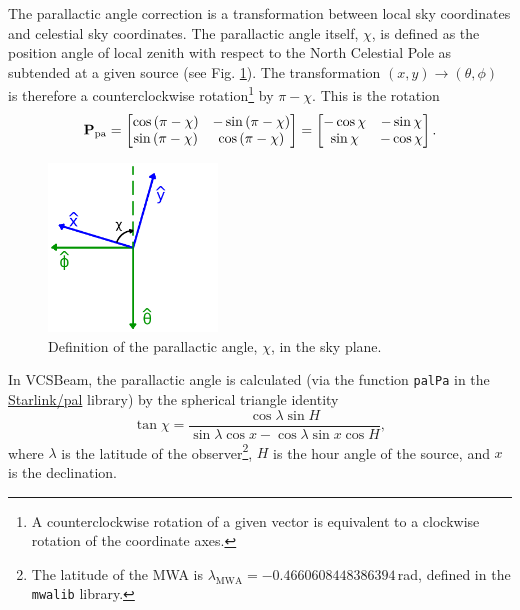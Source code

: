 \documentclass{book}
\newcommand{\vcsbeam}{{\sc VCSBeam}}
\newcommand{\pamat}{\ensuremath{{\bf P}_\text{pa}}}
\begin{document}
The parallactic angle correction is a transformation between local sky coordinates and celestial sky coordinates.
The parallactic angle itself, $\chi$, is defined as the position angle of local zenith with respect to the North Celestial Pole as subtended at a given source (see Fig. \ref{fig:skyangles}).
The transformation $(x,y)\rightarrow(\theta,\phi)$ is therefore a counterclockwise rotation\footnote{A counterclockwise rotation of a given vector is equivalent to a clockwise rotation of the coordinate axes.} by $\pi - \chi$.
This is the rotation
\begin{equation}
    \pamat
        = \begin{bmatrix}
            \cos\left(\pi - \chi\right) & -\sin\left(\pi - \chi\right) \\
            \sin\left(\pi - \chi\right) &  \cos\left(\pi - \chi\right)
        \end{bmatrix}
        = \begin{bmatrix}
            -\cos\chi & -\sin\chi \\
             \sin\chi & -\cos\chi
        \end{bmatrix}.
\end{equation}
\begin{figure}[!th]
    \centering
    \includegraphics[width=0.4\textwidth]{skyangles.png}
    \caption{Definition of the parallactic angle, $\chi$, in the sky plane.}
    \label{fig:skyangles}
\end{figure}
In \vcsbeam{}, the parallactic angle is calculated (via the function \texttt{palPa} in the \href{https://github.com/Starlink/pal}{Starlink/pal} library) by the spherical triangle identity
\begin{equation}
    \tan \chi = \frac{\cos \lambda \sin H}{\sin\lambda \cos x - \cos \lambda \sin x \cos H},
\end{equation}
where $\lambda$ is the latitude of the observer\footnote{The latitude of the MWA is $\lambda_\text{MWA} = -0.4660608448386394\,$rad, defined in the \texttt{mwalib} library.}, $H$ is the hour angle of the source, and $x$ is the declination.
\end{document}
